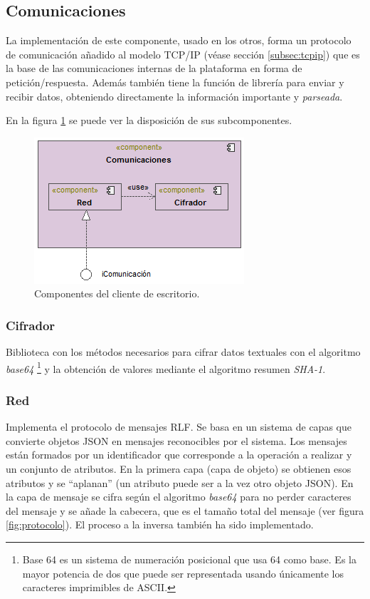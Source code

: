 \subsection{Comunicaciones}
La implementación de este componente, usado en los otros, forma un 
protocolo de comunicación añadido al modelo TCP/IP (véase sección 
\ref{subsec:tcpip}) que es la base de las comunicaciones internas de 
la plataforma en forma de petición/respuesta. Además también tiene 
la función de librería para enviar y recibir datos, 
obteniendo directamente la información importante y \emph{parseada}.

En la figura \ref{fig:comunicaciones} se puede ver la disposición de 
sus subcomponentes.

\begin{figure}[h]
	\centering
	\includegraphics[scale=0.65]{images/Comunicaciones.png}
	\caption[Cliente de escritorio]{Componentes del cliente de 
	escritorio.}
	\label{fig:comunicaciones}
\end{figure}


\subsubsection{Cifrador}
Biblioteca con los métodos necesarios para cifrar datos textuales con 
el algoritmo \emph{base64} \footnote{Base 64 es un sistema de 
numeración posicional que usa 64 como base. Es la mayor potencia de 
dos que puede ser representada usando únicamente los caracteres 
imprimibles de ASCII.\cite{Tanenbaum}} y la obtención de valores 
mediante el algoritmo resumen \emph{SHA-1}.

\subsubsection{Red}
Implementa el protocolo de mensajes RLF. Se basa en un sistema de 
capas que convierte objetos JSON en mensajes reconocibles por el 
sistema. Los mensajes están formados por un identificador que 
corresponde a la operación a realizar y un conjunto de atributos. En 
la primera capa (capa de objeto) se obtienen esos atributos y se 
``aplanan'' (un atributo puede ser a la vez otro objeto JSON). En la 
capa de mensaje se cifra según el algoritmo \emph{base64} para no 
perder caracteres del mensaje y se añade la cabecera, que es el 
tamaño total del mensaje (ver figura \ref{fig:protocolo}). El proceso a 
la inversa también ha sido implementado.

